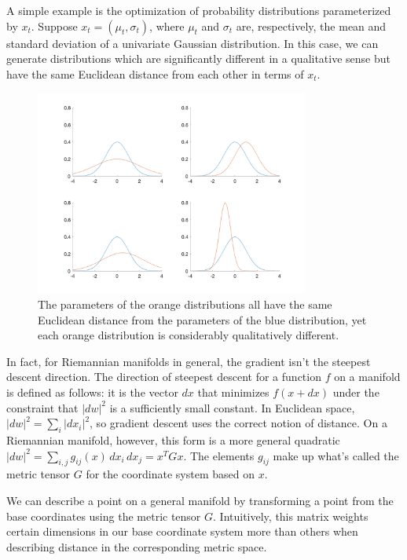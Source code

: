 \documentclass[twoside,10pt]{article}
\begin{document}
A simple example is the optimization of probability distributions parameterized by $x_t$. Suppose $x_t = (\mu_t, \sigma_t)$, where $\mu_t$ and $\sigma_t$ are, respectively, the mean and standard deviation of a univariate Gaussian distribution. In this case, we can generate distributions which are significantly different in a qualitative sense but have the same Euclidean distance from each other in terms of $x_t$.

\begin{figure}[H]
    \centering
    \includegraphics[width=9cm]{img/gaussians.png}
    \caption{The parameters of the orange distributions all have the same Euclidean distance from the parameters of the blue distribution, yet each orange distribution is considerably qualitatively different.}
\end{figure}

In fact, for Riemannian manifolds in general, the gradient isn't the steepest descent direction.\cite{amari} The direction of steepest descent for a function $f$ on a manifold is defined as follows: it is the vector $dx$ that minimizes $f(x+dx)$ under the constraint that $\vert dw \vert^2$ is a sufficiently small constant. In Euclidean space, $\vert dw \vert^2 = \sum_i \vert dx_i \vert^2$, so gradient descent uses the correct notion of distance. On a Riemannian manifold, however, this form is a more general quadratic $\vert dw \vert^2 = \sum_{i,j} g_{ij}(x) \, dx_i \, dx_j = x^T G x$. The elements $g_{ij}$ make up what's called the metric tensor $G$ for the coordinate system based on $x$.\cite{amari}

We can describe a point on a general manifold by transforming a point from the base coordinates using the metric tensor $G$. Intuitively, this matrix weights certain dimensions in our base coordinate system more than others when describing distance in the corresponding metric space.
\end{document}
